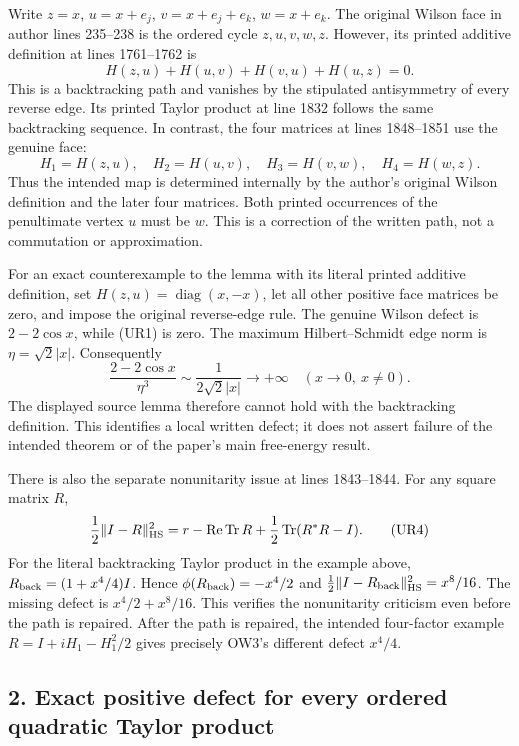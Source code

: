 \documentclass[11pt]{article}
\begin{document}
Write \(z=x\), \(u=x+e_j\), \(v=x+e_j+e_k\), \(w=x+e_k\). The original Wilson face in author lines 235–238 is the ordered cycle \(z,u,v,w,z\). However, its printed additive definition at lines 1761–1762 is
\[
 H(z,u)+H(u,v)+H(v,u)+H(u,z)=0.
 \tag{UR1}
\]
This is a backtracking path and vanishes by the stipulated antisymmetry of every reverse edge. Its printed Taylor product at line 1832 follows the same backtracking sequence. In contrast, the four matrices at lines 1848–1851 use the genuine face:
\[
 H_1=H(z,u),\quad H_2=H(u,v),\quad
 H_3=H(v,w),\quad H_4=H(w,z).
 \tag{UR2}
\]
Thus the intended map is determined internally by the author's original Wilson definition and the later four matrices. Both printed occurrences of the penultimate vertex \(u\) must be \(w\). This is a correction of the written path, not a commutation or approximation.

For an exact counterexample to the lemma with its literal printed additive definition, set \(H(z,u)=\operatorname{diag}(x,-x)\), let all other positive face matrices be zero, and impose the original reverse-edge rule. The genuine Wilson defect is \(2-2\cos x\), while (UR1) is zero. The maximum Hilbert–Schmidt edge norm is \(\eta=\sqrt2|x|\). Consequently
\[
 \frac{2-2\cos x}{\eta^3}
 \sim\frac{1}{2\sqrt2|x|}\longrightarrow+\infty
       \quad(x\longrightarrow0,\ x\ne0).
 \tag{UR3}
\]
The displayed source lemma therefore cannot hold with the backtracking definition. This identifies a local written defect; it does not assert failure of the intended theorem or of the paper's main free-energy result.

There is also the separate nonunitarity issue at lines 1843–1844. For any square matrix \(R\),
\[
 \frac12\|I-R\|_{\rm HS}^2
 =r-\operatorname{Re}\operatorname{Tr}R
          +\frac12\operatorname{Tr}(R^*R-I).
 \tag{UR4}
\]
For the literal backtracking Taylor product in the example above,
\(R_{\rm back}=(1+x^4/4)I\). Hence
\(\phi(R_{\rm back})=-x^4/2\) and
\(\frac12\|I-R_{\rm back}\|_{\rm HS}^2=x^8/16\).
The missing defect is \(x^4/2+x^8/16\). This verifies the nonunitarity criticism even before the path is repaired. After the path is repaired, the intended four-factor example \(R=I+iH_1-H_1^2/2\) gives precisely OW3's different defect \(x^4/4\).

\subsection*{2. Exact positive defect for every ordered quadratic Taylor product}
\end{document}
